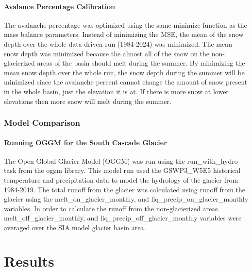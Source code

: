 \documentclass{article}
\begin{document}
\paragraph{Avalance Percentage Calibration}
The avalanche percentage was optimized using the same minimize function as the mass balance parameters. Instead of minimizing the MSE, the mean of the 
snow depth over the whole data driven run (1984-2024) was minimized. The mean snow depth was minimized because the almost all of the snow on the 
non-glacierized areas of the basin should melt during the summer. By minimizing the mean snow depth over the whole run, the snow depth during 
the summer will be minimized since the avalanche percent cannot change the amount of snow present in the whole basin, just the elevation it is at. If 
there is more snow at lower elevations then more snow will melt during the summer.

\subsubsection{Model Comparison}
\paragraph{Running OGGM for the South Cascade Glacier}
The Open Global Glacier Model (OGGM) was run using the run\_with\_hydro task from the oggm library. This model run used the GSWP3\_W5E5 historical temperature and 
precipitation data \cite{ref10} to model the hydrology of the glacier from 1984-2019. The total runoff from the glacier was calculated using 
runoff from the glacier using the melt\_on\_glacier\_monthly, and liq\_precip\_on\_glacier\_monthly variables. In order 
to calculate the runoff from the non-glacierized areas melt\_off\_glacier\_monthly, and liq\_precip\_off\_glacier\_monthly variables were averaged over the 
SIA model glacier basin area. 

\section{Results}
\end{document}

